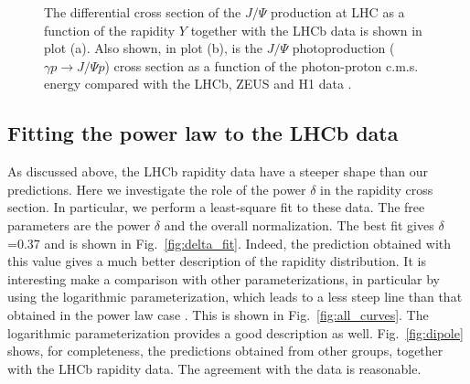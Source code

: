 \documentclass[12pt]{article}
\begin{document}
\begin{figure}[!h]
  \centering
  \caption{The differential cross section of the $J/\Psi$ production at LHC as a function of the rapidity $Y$ together with the LHCb data is shown in plot (a). Also shown, in plot (b), is the $J/\Psi$ photoproduction ($\gamma p \to J/\Psi p$) cross section as a function of the photon-proton c.m.s. energy compared
           with the LHCb, ZEUS and H1 data .}
\end{figure}

\subsection{Fitting the power law to the LHCb data}

As discussed above, the LHCb rapidity data have a steeper shape than our predictions.
Here we investigate the role of the power $\delta$ in the rapidity cross section.
In particular, we perform a least-square fit to these data.
The free parameters are the power $\delta$ and the overall normalization.
The best fit gives $\delta$=0.37 and is shown in Fig.~\ref{fig:delta_fit}.
Indeed, the prediction  obtained with this value gives a much better description of the rapidity distribution.
It is interesting make a comparison with other parameterizations, in particular by using the
logarithmic parameterization, which leads to a less steep line than that obtained in the power law case .
This is shown  in Fig.~\ref{fig:all_curves}. The logarithmic parameterization provides a good description as well.
Fig.~\ref{fig:dipole} shows, for completeness, the predictions obtained from other groups, together with the LHCb rapidity data.
The agreement with the data is reasonable.
\end{document}
